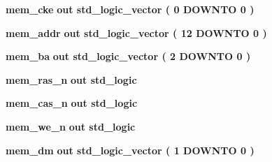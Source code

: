 \begin{DoxyCompactItemize}
\item 
{\bf mem\+\_\+cke}  {\bfseries {\bfseries \textcolor{keywordflow}{out}\textcolor{vhdlchar}{ }}} {\bfseries \textcolor{comment}{std\+\_\+logic\+\_\+vector}\textcolor{vhdlchar}{ }\textcolor{vhdlchar}{(}\textcolor{vhdlchar}{ }\textcolor{vhdlchar}{ } \textcolor{vhdldigit}{0} \textcolor{vhdlchar}{ }\textcolor{keywordflow}{D\+O\+W\+N\+TO}\textcolor{vhdlchar}{ }\textcolor{vhdlchar}{ } \textcolor{vhdldigit}{0} \textcolor{vhdlchar}{ }\textcolor{vhdlchar}{)}\textcolor{vhdlchar}{ }} 
\item 
{\bf mem\+\_\+addr}  {\bfseries {\bfseries \textcolor{keywordflow}{out}\textcolor{vhdlchar}{ }}} {\bfseries \textcolor{comment}{std\+\_\+logic\+\_\+vector}\textcolor{vhdlchar}{ }\textcolor{vhdlchar}{(}\textcolor{vhdlchar}{ }\textcolor{vhdlchar}{ } \textcolor{vhdldigit}{12} \textcolor{vhdlchar}{ }\textcolor{keywordflow}{D\+O\+W\+N\+TO}\textcolor{vhdlchar}{ }\textcolor{vhdlchar}{ } \textcolor{vhdldigit}{0} \textcolor{vhdlchar}{ }\textcolor{vhdlchar}{)}\textcolor{vhdlchar}{ }} 
\item 
{\bf mem\+\_\+ba}  {\bfseries {\bfseries \textcolor{keywordflow}{out}\textcolor{vhdlchar}{ }}} {\bfseries \textcolor{comment}{std\+\_\+logic\+\_\+vector}\textcolor{vhdlchar}{ }\textcolor{vhdlchar}{(}\textcolor{vhdlchar}{ }\textcolor{vhdlchar}{ } \textcolor{vhdldigit}{2} \textcolor{vhdlchar}{ }\textcolor{keywordflow}{D\+O\+W\+N\+TO}\textcolor{vhdlchar}{ }\textcolor{vhdlchar}{ } \textcolor{vhdldigit}{0} \textcolor{vhdlchar}{ }\textcolor{vhdlchar}{)}\textcolor{vhdlchar}{ }} 
\item 
{\bf mem\+\_\+ras\+\_\+n}  {\bfseries {\bfseries \textcolor{keywordflow}{out}\textcolor{vhdlchar}{ }}} {\bfseries \textcolor{comment}{std\+\_\+logic}\textcolor{vhdlchar}{ }} 
\item 
{\bf mem\+\_\+cas\+\_\+n}  {\bfseries {\bfseries \textcolor{keywordflow}{out}\textcolor{vhdlchar}{ }}} {\bfseries \textcolor{comment}{std\+\_\+logic}\textcolor{vhdlchar}{ }} 
\item 
{\bf mem\+\_\+we\+\_\+n}  {\bfseries {\bfseries \textcolor{keywordflow}{out}\textcolor{vhdlchar}{ }}} {\bfseries \textcolor{comment}{std\+\_\+logic}\textcolor{vhdlchar}{ }} 
\item 
{\bf mem\+\_\+dm}  {\bfseries {\bfseries \textcolor{keywordflow}{out}\textcolor{vhdlchar}{ }}} {\bfseries \textcolor{comment}{std\+\_\+logic\+\_\+vector}\textcolor{vhdlchar}{ }\textcolor{vhdlchar}{(}\textcolor{vhdlchar}{ }\textcolor{vhdlchar}{ } \textcolor{vhdldigit}{1} \textcolor{vhdlchar}{ }\textcolor{keywordflow}{D\+O\+W\+N\+TO}\textcolor{vhdlchar}{ }\textcolor{vhdlchar}{ } \textcolor{vhdldigit}{0} \textcolor{vhdlchar}{ }\textcolor{vhdlchar}{)}\textcolor{vhdlchar}{ }} 

\end{DoxyCompactItemize}
